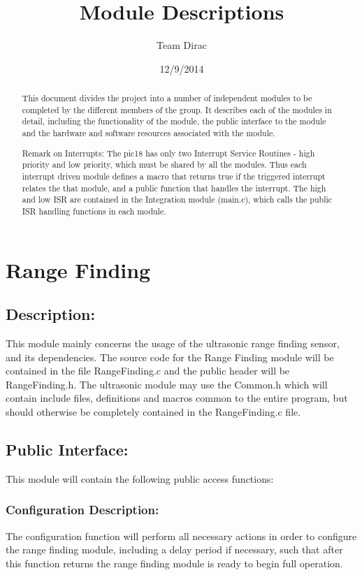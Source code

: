 \documentclass[]{article}
\title{Module Descriptions}
\author{Team Dirac}
\date{12/9/2014}
\begin{document}
\maketitle

\newpage

\begin{abstract}
	This document divides the project into a number of independent modules to be completed by the different members of the group. It describes each of the modules in detail, including the functionality of the module, the public interface to the module and the hardware and software resources associated with the module.\newline
	
	Remark on Interrupts: The pic18 has only two Interrupt Service Routines - high priority and low priority, which must be shared by all the modules. Thus each interrupt driven module defines a macro that returns true if the triggered interrupt relates the that module, and a public function that handles the interrupt. The high and low ISR are contained in the Integration module (main.c), which calls the public ISR handling functions in each module.
\end{abstract}

\newpage

\section{Range Finding}

\subsection{Description:}
This module mainly concerns the usage of the ultrasonic range finding sensor, and its dependencies. The source code for the Range Finding module will be contained in the file RangeFinding.c and the public header will be RangeFinding.h. The ultrasonic module may use the Common.h which will contain include files, definitions and macros common to the entire program, but should otherwise be completely contained in the RangeFinding.c file.

\subsection{Public Interface:}
This module will contain the following public access functions:

\subsubsection{Configuration Description:}
The configuration function will perform all necessary actions in order to configure the range finding module, including a delay period if necessary, such that after this function returns the range finding module is ready to begin full operation.
\end{document}
